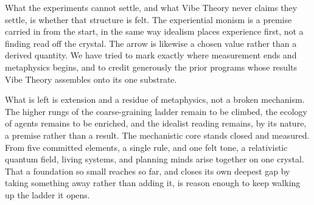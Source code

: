 What the experiments cannot settle, and what Vibe Theory never claims they settle, is whether that structure
is felt. The experiential monism is a premise carried in from the start, in the same way idealism places
experience first, not a finding read off the crystal. The arrow is likewise a chosen value rather than a
derived quantity. We have tried to mark exactly where measurement ends and metaphysics begins, and to credit
generously the prior programs whose results Vibe Theory assembles onto its one substrate.

What is left is extension and a residue of metaphysics, not a broken mechanism. The higher rungs of the
coarse-graining ladder remain to be climbed, the ecology of agents remains to be enriched, and the idealist
reading remains, by its nature, a premise rather than a result. The mechanistic core stands closed and
measured. From five committed elements, a single rule, and one felt tone, a relativistic quantum field, living
systems, and planning minds arise together on one crystal. That a foundation so small reaches so far, and
closes its own deepest gap by taking something away rather than adding it, is reason enough to keep walking up
the ladder it opens.
